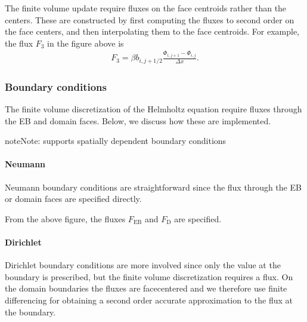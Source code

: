\documentclass[letterpaper,10pt,english]{sphinxmanual}
\begin{document}
\sphinxAtStartPar
The finite volume update require fluxes on the face centroids rather than the centers.
These are constructed by first computing the fluxes to second order on the face centers, and then interpolating them to the face centroids.
For example, the flux \(F_3\) in the figure above is
\begin{equation*}
\begin{split}F_3 = \beta b_{i,j+1/2}\frac{\Phi_{i,j+1} - \Phi_{i,j}}{\Delta x}.\end{split}
\end{equation*}

\subsubsection{Boundary conditions}
\label{\detokenize{Source/LinearSolvers:boundary-conditions}}
\sphinxAtStartPar
The finite volume discretization of the Helmholtz equation require fluxes through the EB and domain faces.
Below, we discuss how these are implemented.

\begin{sphinxadmonition}{note}{Note:}
\sphinxAtStartPar
{} supports spatially dependent boundary conditions
\end{sphinxadmonition}


\paragraph{Neumann}
\label{\detokenize{Source/LinearSolvers:neumann}}
\sphinxAtStartPar
Neumann boundary conditions are straightforward since the flux through the EB or domain faces are specified directly.

\sphinxAtStartPar
From the above figure, the fluxes \(F_{\textrm{EB}}\) and \(F_{\textrm{D}}\) are specified.


\paragraph{Dirichlet}
\label{\detokenize{Source/LinearSolvers:dirichlet}}\label{\detokenize{Source/LinearSolvers:chap-linearsolverdirichletbc}}
\sphinxAtStartPar
Dirichlet boundary conditions are more involved since only the value at the boundary is prescribed, but the finite volume discretization requires a flux.
On the domain boundaries the fluxes are face\sphinxhyphen{}centered and we therefore use finite differencing for obtaining a second order accurate approximation to the flux at the boundary.
\end{document}
